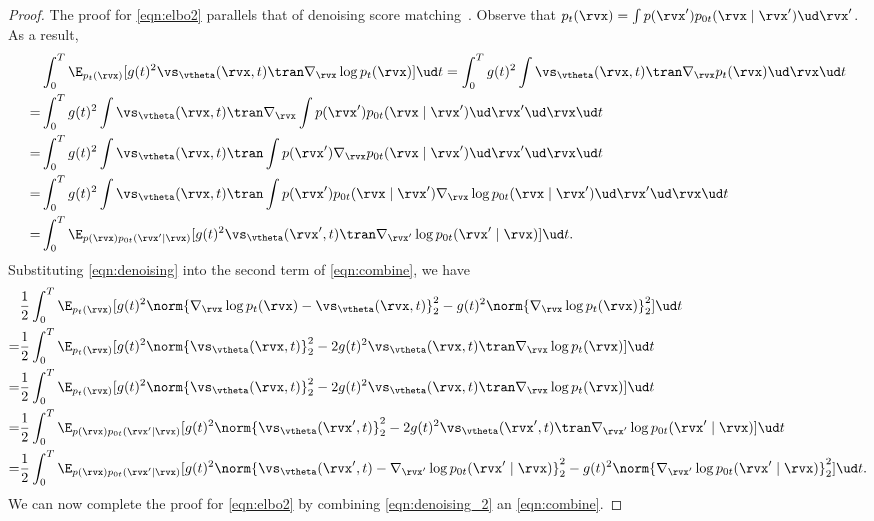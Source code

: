 \begin{proof}
The proof for \cref{eqn:elbo2} parallels that of denoising score matching~\cite{vincent2011connection}. Observe that $p_t(\rvx) = \int p(\rvx') p_{0t}(\rvx \mid \rvx') \ud \rvx'$. As a result,
\begin{align}
    &\int_0^T \E_{p_t(\rvx)}[g(t)^2 \vs_\vtheta(\rvx, t)\tran \nabla_\rvx \log p_t(\rvx)]\ud t = \int_0^T g(t)^2 \int \vs_\vtheta(\rvx, t)\tran \nabla_\rvx p_t(\rvx) \ud \rvx \ud t \notag \\
    =& \int_0^T g(t)^2 \int \vs_\vtheta(\rvx, t)\tran \nabla_\rvx \int p(\rvx') p_{0t}(\rvx \mid \rvx') \ud \rvx' \ud \rvx \ud t \notag \\
    =& \int_0^T g(t)^2 \int \vs_\vtheta(\rvx, t)\tran \int p(\rvx') \nabla_\rvx p_{0t}(\rvx \mid \rvx') \ud \rvx' \ud \rvx \ud t \notag\\
    =& \int_0^T g(t)^2 \int \vs_\vtheta(\rvx, t)\tran \int p(\rvx') p_{0t}(\rvx \mid \rvx')\nabla_\rvx \log p_{0t}(\rvx \mid \rvx') \ud \rvx' \ud \rvx \ud t \notag \\
    =& \int_0^T \E_{p(\rvx)p_{0t}(\rvx' \mid \rvx)}[g(t)^2  \vs_\vtheta(\rvx', t)\tran \nabla_{\rvx'} \log p_{0t}(\rvx' \mid \rvx)] \ud t. \label{eqn:denoising}
\end{align}
Substituting \cref{eqn:denoising} into the second term of \cref{eqn:combine}, we have
\begin{align}
    & \frac{1}{2}\int_0^T \E_{p_t(\rvx)}[g(t)^2\norm{\nabla_\rvx \log p_t(\rvx) - \vs_\vtheta(\rvx, t)}_2^2 - g(t)^2 \norm{\nabla_\rvx \log p_t(\rvx)}_2^2]\ud t \notag \\
    =& \frac{1}{2}\int_0^T \E_{p_t(\rvx)}[g(t)^2 \norm{\vs_\vtheta(\rvx, t)}_2^2 - 2 g(t)^2 \vs_\vtheta(\rvx,t)\tran \nabla_\rvx \log p_t(\rvx)] \ud t \notag \\
    =& \frac{1}{2}\int_0^T \E_{p_t(\rvx)}[g(t)^2 \norm{\vs_\vtheta(\rvx, t)}_2^2 - 2 g(t)^2 \vs_\vtheta(\rvx,t)\tran \nabla_\rvx \log p_t(\rvx)] \ud t \notag \\
    =& \frac{1}{2}\int_0^T \E_{p(\rvx)p_{0t}(\rvx'\mid \rvx)}[g(t)^2 \norm{\vs_\vtheta(\rvx', t)}_2^2 - 2 g(t)^2 \vs_\vtheta(\rvx',t)\tran \nabla_{\rvx'} \log p_{0t}(\rvx' \mid \rvx)] \ud t \notag \\
    =& \frac{1}{2}\int_0^T \E_{p(\rvx)p_{0t}(\rvx'\mid \rvx)}[g(t)^2\norm{\vs_\vtheta(\rvx', t) - \nabla_{\rvx'}\log p_{0t}(\rvx' \mid \rvx)}_2^2 - g(t)^2 \norm{\nabla_{\rvx'}\log p_{0t}(\rvx' \mid \rvx)}_2^2] \ud t. \label{eqn:denoising_2}
\end{align}
We can now complete the proof for \cref{eqn:elbo2} by combining \cref{eqn:denoising_2} an \cref{eqn:combine}.
\end{proof}


